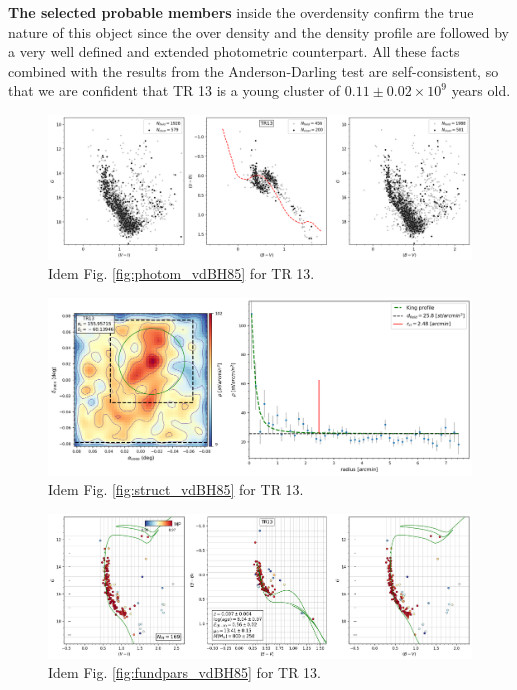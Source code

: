 \documentclass[referee]{aa}
\begin{document}
\textbf{The selected probable members} inside the overdensity confirm the
true nature of this object since the over density and the density profile are
followed by a very well defined and extended photometric counterpart. All these
facts combined with the results from the Anderson-Darling test are
self-consistent, so that we are confident that TR 13 is a young cluster of
$0.11\pm0.02\times10^9$ years old.

\begin{figure}[ht]
    \centering
    \includegraphics[width=\hsize]{../figs/obs_TR13.png}
    \caption{Idem Fig. \ref{fig:photom_vdBH85} for TR 13.}
    \label{fig39}
\end{figure}
\begin{figure}[ht]
    \centering
    \includegraphics[width=\hsize]{../figs/dmap_trumpler13.png}
    \caption{Idem Fig. \ref{fig:struct_vdBH85} for TR 13.}
    \label{fig40}
\end{figure}
\begin{figure}[ht]
    \centering
    \includegraphics[width=\hsize]{../figs/cmds_tr13.png}
    \caption{Idem Fig. \ref{fig:fundpars_vdBH85} for TR 13.}
    \label{fig41}
\end{figure}
\end{document}
